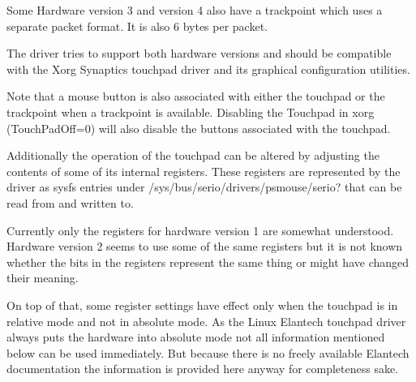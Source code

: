 \documentclass[a4paper,8pt,english]{sphinxmanual}
\begin{document}
Some Hardware version 3 and version 4 also have a trackpoint which uses a
separate packet format. It is also 6 bytes per packet.

The driver tries to support both hardware versions and should be compatible
with the Xorg Synaptics touchpad driver and its graphical configuration
utilities.

Note that a mouse button is also associated with either the touchpad or the
trackpoint when a trackpoint is available.  Disabling the Touchpad in xorg
(TouchPadOff=0) will also disable the buttons associated with the touchpad.

Additionally the operation of the touchpad can be altered by adjusting the
contents of some of its internal registers. These registers are represented
by the driver as sysfs entries under /sys/bus/serio/drivers/psmouse/serio?
that can be read from and written to.

Currently only the registers for hardware version 1 are somewhat understood.
Hardware version 2 seems to use some of the same registers but it is not
known whether the bits in the registers represent the same thing or might
have changed their meaning.

On top of that, some register settings have effect only when the touchpad is
in relative mode and not in absolute mode. As the Linux Elantech touchpad
driver always puts the hardware into absolute mode not all information
mentioned below can be used immediately. But because there is no freely
available Elantech documentation the information is provided here anyway for
completeness sake.
\end{document}
